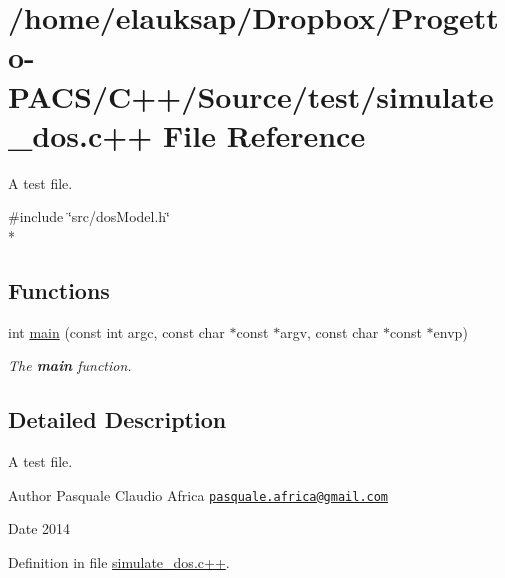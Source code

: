 \hypertarget{simulate__dos_8c_09_09}{\section{/home/elauksap/\-Dropbox/\-Progetto-\/\-P\-A\-C\-S/\-C++/\-Source/test/simulate\-\_\-dos.c++ File Reference}
\label{simulate__dos_8c_09_09}
}


A test file.  


{\ttfamily \#include \char`\"{}src/dos\-Model.\-h\char`\"{}}\\*
\subsection*{Functions}
\begin{DoxyCompactItemize}
\item 
\hypertarget{simulate__dos_8c_09_09_abb42499d73e7c21855b75ac125b8da84}{int \hyperlink{simulate__dos_8c_09_09_abb42499d73e7c21855b75ac125b8da84}{main} (const int argc, const char $\ast$const $\ast$argv, const char $\ast$const $\ast$envp)}\label{simulate__dos_8c_09_09_abb42499d73e7c21855b75ac125b8da84}

\begin{DoxyCompactList}\small\item\em The {\bfseries main} function. \end{DoxyCompactList}\end{DoxyCompactItemize}


\subsection{Detailed Description}
A test file. \begin{DoxyAuthor}{Author}
Pasquale Claudio Africa \href{mailto:pasquale.africa@gmail.com}{\tt pasquale.\-africa@gmail.\-com} 
\end{DoxyAuthor}
\begin{DoxyDate}{Date}
2014 
\end{DoxyDate}


Definition in file \hyperlink{simulate__dos_8c_09_09_source}{simulate\-\_\-dos.\-c++}.

